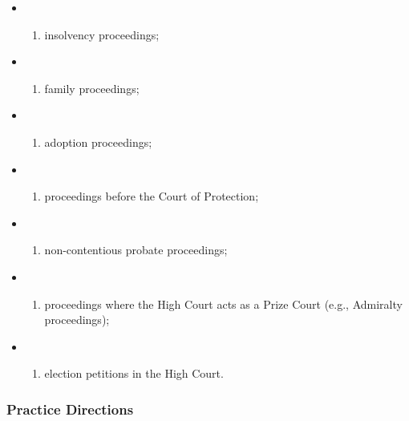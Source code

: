 \documentclass[
]{article}
\providecommand{\tightlist}{%
  \setlength{\itemsep}{0pt}\setlength{\parskip}{0pt}}
\begin{document}
\begin{itemize}
\item
  \begin{enumerate}
  \def\labelenumi{(\alph{enumi})}
  \tightlist
  \item
    insolvency proceedings;
  \end{enumerate}
\item
  \begin{enumerate}
  \def\labelenumi{(\alph{enumi})}
  \setcounter{enumi}{1}
  \tightlist
  \item
    family proceedings;
  \end{enumerate}
\item
  \begin{enumerate}
  \def\labelenumi{(\alph{enumi})}
  \setcounter{enumi}{2}
  \tightlist
  \item
    adoption proceedings;
  \end{enumerate}
\item
  \begin{enumerate}
  \def\labelenumi{(\alph{enumi})}
  \setcounter{enumi}{3}
  \tightlist
  \item
    proceedings before the Court of Protection;
  \end{enumerate}
\item
  \begin{enumerate}
  \def\labelenumi{(\alph{enumi})}
  \setcounter{enumi}{4}
  \tightlist
  \item
    non-contentious probate proceedings;
  \end{enumerate}
\item
  \begin{enumerate}
  \def\labelenumi{(\alph{enumi})}
  \setcounter{enumi}{5}
  \tightlist
  \item
    proceedings where the High Court acts as a Prize Court (e.g.,
    Admiralty proceedings);
  \end{enumerate}
\item
  \begin{enumerate}
  \def\labelenumi{(\alph{enumi})}
  \setcounter{enumi}{6}
  \tightlist
  \item
    election petitions in the High Court.
  \end{enumerate}
\end{itemize}

\hypertarget{practice-directions}{%
\subsubsection{Practice Directions}\label{practice-directions}}
\end{document}
